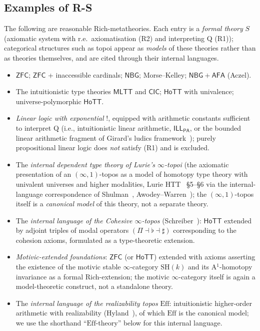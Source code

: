 \documentclass[11pt]{article}
\theoremstyle{plain}
\theoremstyle{definition}
\newcommand{\ZFC}{\mathsf{ZFC}}
\newcommand{\MLTT}{\mathsf{MLTT}}
\newcommand{\HoTT}{\mathsf{HoTT}}
\newcommand{\CIC}{\mathsf{CIC}}
\newcommand{\NBG}{\mathsf{NBG}}
\newcommand{\AFA}{\mathsf{AFA}}
\begin{document}
\subsection{Examples of R-S}

The following are reasonable Rich-metatheories. Each entry is a \emph{formal theory} $S$ (axiomatic system with r.e.\ axiomatisation (R2) and interpreting Q (R1)); categorical structures such as topoi appear as \emph{models} of these theories rather than as theories themselves, and are cited through their internal languages.
\begin{itemize}
\item $\ZFC$; $\ZFC$ + inaccessible cardinals; $\NBG$; Morse--Kelley; $\NBG + \AFA$ (Aczel).
\item The intuitionistic type theories $\MLTT$ and $\CIC$; $\HoTT$ with univalence; universe-polymorphic $\HoTT$.
\item \emph{Linear logic with exponential} $!$, equipped with arithmetic constants sufficient to interpret Q (i.e., intuitionistic linear arithmetic, $\mathsf{ILL}_{\mathsf{PA}}$, or the bounded linear arithmetic fragment of Girard's ludics framework~\cite{Girard2001}); purely propositional linear logic does \emph{not} satisfy (R1) and is excluded.
\item The \emph{internal dependent type theory of Lurie's $\infty$-topoi} (the axiomatic presentation of an $(\infty, 1)$-topos as a model of homotopy type theory with univalent universes and higher modalities, Lurie HTT~\cite{LurieHTT} \S 5--\S 6 via the internal-language correspondence of Shulman~\cite{Shulman2019}, Awodey--Warren~\cite{AwodeyWarren2009}); the $(\infty, 1)$-topos itself is a \emph{canonical model} of this theory, not a separate theory.
\item The \emph{internal language of the Cohesive $\infty$-topos} (Schreiber~\cite{Schreiber2013}): $\HoTT$ extended by adjoint triples of modal operators $(\Pi \dashv \flat \dashv \sharp)$ corresponding to the cohesion axioms, formulated as a type-theoretic extension.
\item \emph{Motivic-extended foundations}: $\ZFC$ (or $\HoTT$) extended with axioms asserting the existence of the motivic stable $\infty$-category $\mathrm{SH}(k)$ and its A$^1$-homotopy invariance as a formal Rich-extension; the motivic $\infty$-category itself is again a model-theoretic construct, not a standalone theory.
\item The \emph{internal language of the realizability topos} $\mathrm{Eff}$: intuitionistic higher-order arithmetic with realizability (Hyland~\cite{Hyland1982}), of which $\mathrm{Eff}$ is the canonical model; we use the shorthand ``$\mathrm{Eff}$-theory'' below for this internal language.

\end{itemize}
\end{document}
